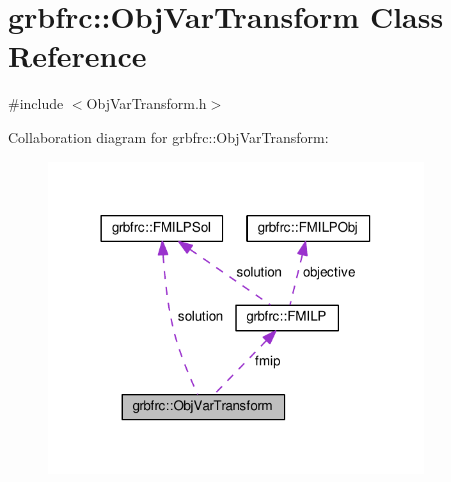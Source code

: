 \hypertarget{classgrbfrc_1_1ObjVarTransform}{}\section{grbfrc\+:\+:Obj\+Var\+Transform Class Reference}
\label{classgrbfrc_1_1ObjVarTransform}


{\ttfamily \#include $<$Obj\+Var\+Transform.\+h$>$}



Collaboration diagram for grbfrc\+:\+:Obj\+Var\+Transform\+:
\nopagebreak
\begin{figure}[H]
\begin{center}
\leavevmode
\includegraphics[width=282pt]{classgrbfrc_1_1ObjVarTransform__coll__graph}
\end{center}
\end{figure}
